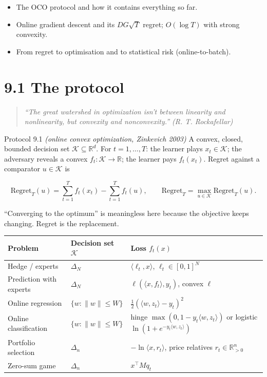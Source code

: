 \documentclass[11pt,a4paper,openany]{book}
\newcommand{\R}{\mathbb{R}}
\newcommand{\Reg}{\mathrm{Regret}}
\newcommand{\ip}[2]{\langle #1,#2\rangle}
\newcommand{\norm}[1]{\lVert #1\rVert}
\newcommand{\simplex}{\Delta}
\newcommand{\cK}{\mathcal{K}}
\begin{document}
\begin{goals}
\begin{itemize}
\item The OCO protocol and how it contains everything so far.
\item Online gradient descent and its $DG\sqrt T$ regret; $O(\log T)$ with strong convexity.
\item From regret to optimisation and to statistical risk (online-to-batch).
\end{itemize}
\end{goals}

\section*{9.1 The protocol}\label{ch9-protocol}

\begin{quote}\itshape
``The great watershed in optimization isn't between linearity and nonlinearity, but convexity and nonconvexity.'' (R. T. Rockafellar)
\end{quote}

\begin{bdef}{Protocol 9.1 \emph{(online convex optimization, Zinkevich 2003)}}
A convex, closed, bounded decision set $\cK\subseteq\R^d$. For $t=1,\dots,T$: the learner plays $x_t\in\cK$; the adversary reveals a convex $f_t:\cK\to\R$; the learner pays $f_t(x_t)$. Regret against a comparator $u\in\cK$ is

\[\Reg_T(u)=\sum_{t=1}^Tf_t(x_t)-\sum_{t=1}^Tf_t(u),\qquad \Reg_T=\max_{u\in\cK}\Reg_T(u).\]

\end{bdef}

``Converging to the optimum'' is meaningless here because the objective keeps changing. Regret is the replacement.

\begin{center}\small
\begin{tabularx}{\linewidth}{YYY}
\toprule
\textbf{Problem} & \textbf{Decision set $\cK$} & \textbf{Loss $f_t(x)$} \\
\midrule
Hedge / experts & $\simplex_N$ & $\ip{\ell_t}{x}$, $\ell_t\in[0,1]^N$ \\
Prediction with experts & $\simplex_N$ & $\ell(\ip{x}{f_t},y_t)$, convex $\ell$ \\
Online regression & $\{w:\norm w\le W\}$ & $\tfrac12(\ip{w}{z_t}-y_t)^2$ \\
Online classification & $\{w:\norm w\le W\}$ & hinge $\max(0,1-y_t\ip{w}{z_t})$ or logistic $\ln(1+e^{-y_t\ip{w}{z_t}})$ \\
Portfolio selection & $\simplex_n$ & $-\ln\ip{x}{r_t}$, price relatives $r_t\in\R^n_{>0}$ \\
Zero-sum game & $\simplex_n$ & $x^\top Mq_t$ \\
\bottomrule
\end{tabularx}
\end{center}
\end{document}
